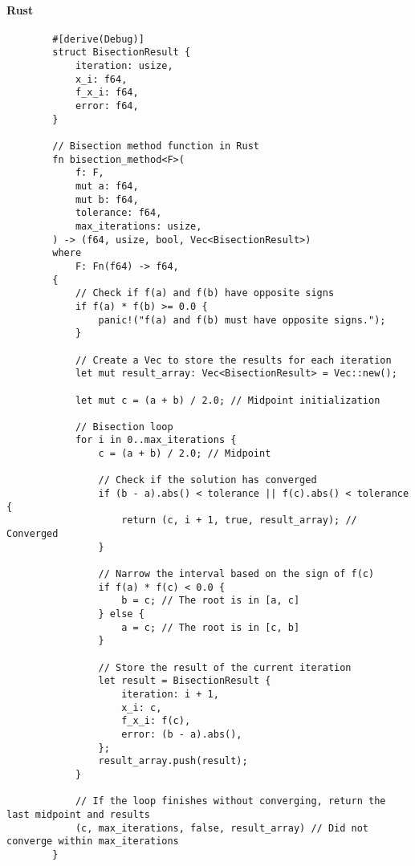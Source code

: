 \documentclass{article}
\begin{document}
    \paragraph{Rust}
    \begin{verbatim}
        #[derive(Debug)]
        struct BisectionResult {
            iteration: usize,
            x_i: f64,
            f_x_i: f64,
            error: f64,
        }

        // Bisection method function in Rust
        fn bisection_method<F>(
            f: F,
            mut a: f64,
            mut b: f64,
            tolerance: f64,
            max_iterations: usize,
        ) -> (f64, usize, bool, Vec<BisectionResult>)
        where
            F: Fn(f64) -> f64,
        {
            // Check if f(a) and f(b) have opposite signs
            if f(a) * f(b) >= 0.0 {
                panic!("f(a) and f(b) must have opposite signs.");
            }

            // Create a Vec to store the results for each iteration
            let mut result_array: Vec<BisectionResult> = Vec::new();

            let mut c = (a + b) / 2.0; // Midpoint initialization

            // Bisection loop
            for i in 0..max_iterations {
                c = (a + b) / 2.0; // Midpoint

                // Check if the solution has converged
                if (b - a).abs() < tolerance || f(c).abs() < tolerance {
                    return (c, i + 1, true, result_array); // Converged
                }

                // Narrow the interval based on the sign of f(c)
                if f(a) * f(c) < 0.0 {
                    b = c; // The root is in [a, c]
                } else {
                    a = c; // The root is in [c, b]
                }

                // Store the result of the current iteration
                let result = BisectionResult {
                    iteration: i + 1,
                    x_i: c,
                    f_x_i: f(c),
                    error: (b - a).abs(),
                };
                result_array.push(result);
            }

            // If the loop finishes without converging, return the last midpoint and results
            (c, max_iterations, false, result_array) // Did not converge within max_iterations
        }
    \end{verbatim}
\end{document}
